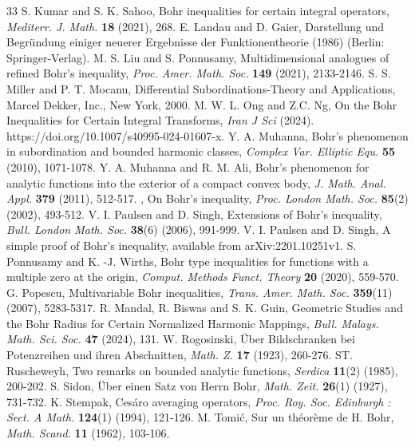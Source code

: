 \documentclass[11pt,reqno]{amsart}
\newtheorem{open problem}{Open problem}[section]
\numberwithin{equation}{section}
\begin{document}
\begin{thebibliography}{33}
 {\sc S. Kumar and S. K. Sahoo}, Bohr inequalities for certain integral operators, {\it Mediterr. J. Math.} {\bf18} (2021), 268.
 {\sc E. Landau and D. Gaier}, Darstellung und Begr\"undung einiger neuerer Ergebnisse der Funktionentheorie (1986) (Berlin: Springer-Verlag).
 {\sc M. S. Liu and S. Ponnusamy}, Multidimensional analogues of refined Bohr’s inequality, {\it Proc. Amer. Math. Soc.} {\bf149} (2021), 2133-2146.
 {\sc S. S. Miller and P. T. Mocanu}, Differential Subordinations-Theory and Applications, Marcel Dekker, Inc., New York, 2000.
 {\sc M. W. L. Ong and Z.C. Ng}, On the Bohr Inequalities for Certain Integral Transforms, {\it Iran J Sci} (2024). https://doi.org/10.1007/s40995-024-01607-x.
 {\sc Y. A. Muhanna}, Bohr’s phenomenon in subordination and bounded harmonic classes, {\it Complex Var. Elliptic Equ.} {\bf55} (2010), 1071-1078.
 {\sc Y. A. Muhanna and R. M. Ali}, Bohr’s phenomenon for analytic functions into the exterior of a compact convex body, {\it J. Math. Anal. Appl.} {\bf379} (2011), 512-517.
, On Bohr’s inequality, {\it Proc. London Math. Soc.} {\bf85}(2) (2002), 493-512.
 {\sc V. I. Paulsen and D. Singh}, Extensions of Bohr’s inequality, {\it Bull. London Math. Soc.} {\bf38}(6) (2006), 991-999.
 {\sc V. I. Paulsen and D. Singh}, A simple proof of Bohr’s inequality, available from arXiv:2201.10251v1.
 {\sc S. Ponnusamy  and K. -J. Wirths}, Bohr type inequalities for functions with a multiple zero at the origin, {\it Comput. Methods Funct. Theory} {\bf20} (2020), 559-570.
 {\sc G. Popescu}, Multivariable Bohr inequalities, {\it Trans. Amer. Math. Soc.} {\bf359}(11) (2007), 5283-5317.
 {\sc R. Mandal, R. Biswas and S. K. Guin}, Geometric Studies and the Bohr Radius for Certain Normalized Harmonic Mappings, {\it Bull. Malays. Math. Sci. Soc.} {\bf47}  (2024), 131.
 {\sc W. Rogosinski}, \"Uber Bildschranken bei Potenzreihen und ihren Abschnitten, {\it Math. Z.} {\bf17} (1923), 260-276.
 {\sc ST. Ruscheweyh}, Two remarks on bounded analytic functions, {\it Serdica} {\bf11}(2) (1985), 200-202.
 {\sc S. Sidon}, \"Uber einen Satz von Herrn Bohr, {\it Math. Zeit.} {\bf26}(1) (1927), 731-732.
 {\sc K. Stempak}, Ces\'aro averaging operators, {\it Proc. Roy. Soc. Edinburgh : Sect. A Math.} {\bf124}(1) (1994), 121-126.
 {\sc M. Tomi\'c}, Sur un th\'eor\`eme de H. Bohr, {\it Math. Scand.} {\bf11} (1962), 103-106.\end{thebibliography}
\end{document}
